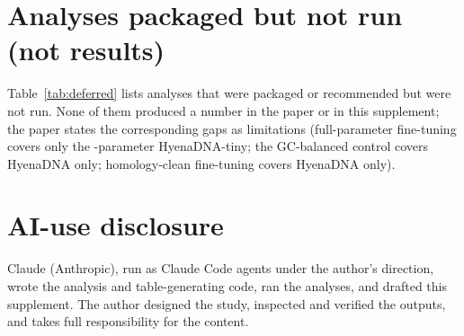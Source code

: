 \documentclass[journal,onecolumn,10pt,letterpaper]{IEEEtran}
\begin{document}
\section{Analyses packaged but not run (not results)}\label{sec:s9}

Table~\ref{tab:deferred} lists analyses that were packaged or recommended but were not run. None of
them produced a number in the paper or in this supplement; the paper states the corresponding gaps as
limitations (full-parameter fine-tuning covers only the \smFTHParamsM-parameter HyenaDNA-tiny; the GC-balanced
control covers HyenaDNA only; homology-clean fine-tuning covers HyenaDNA only).



\clearpage
\section*{AI-use disclosure}
Claude (Anthropic), run as Claude Code agents under the author's direction, wrote the analysis and
table-generating code, ran the analyses, and drafted this supplement. The author designed the study,
inspected and verified the outputs, and takes full responsibility for the content.
\end{document}
